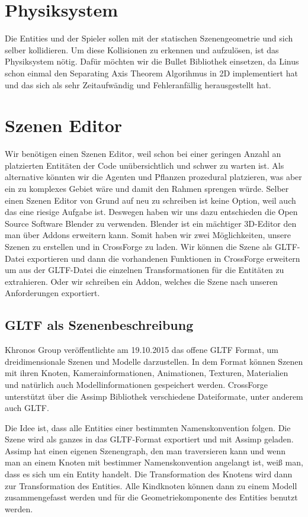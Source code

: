 \section{Physiksystem}

Die Entities und der Spieler sollen mit der statischen Szenengeometrie und sich selber kollidieren. Um diese Kollisionen zu erkennen und aufzulösen, ist das Physiksystem nötig. Dafür möchten wir die Bullet Bibliothek einsetzen, da Linus schon einmal den Separating Axis Theorem Algorihmus in 2D implementiert hat und das sich als sehr Zeitaufwändig und Fehleranfällig herausgestellt hat. 


\section{Szenen Editor}

Wir benötigen einen Szenen Editor, weil schon bei einer geringen Anzahl an platzierten Entitäten der Code unübersichtlich und schwer zu warten ist. Als alternative könnten wir die Agenten und Pflanzen prozedural platzieren, was aber ein zu komplexes Gebiet wäre und damit den Rahmen sprengen würde. Selber einen Szenen Editor von Grund auf neu zu schreiben ist keine Option, weil auch das eine riesige Aufgabe ist. Deswegen haben wir uns dazu entschieden die Open Source Software Blender zu verwenden. Blender ist ein mächtiger 3D-Editor den man über Addons erweitern kann. Somit haben wir zwei Möglichkeiten, unsere Szenen zu erstellen und in CrossForge zu laden. Wir können die Szene als GLTF-Datei exportieren und dann die vorhandenen Funktionen in CrossForge erweitern um aus der GLTF-Datei die einzelnen Transformationen für die Entitäten zu extrahieren. Oder wir schreiben ein Addon, welches die Szene nach unseren Anforderungen exportiert.

\subsection{GLTF als Szenenbeschreibung}

Khronos Group veröffentlichte am 19.10.2015 das offene GLTF Format, um dreidimensionale Szenen und Modelle darzustellen. In dem Format können Szenen mit ihren Knoten, Kamerainformationen, Animationen, Texturen, Materialien und natürlich auch Modellinformationen gespeichert werden. CrossForge unterstützt über die Assimp Bibliothek verschiedene Dateiformate, unter anderem auch GLTF.

Die Idee ist, dass alle Entities einer bestimmten Namenskonvention folgen. Die Szene wird als ganzes in das GLTF-Format exportiert und mit Assimp geladen. Assimp hat einen eigenen Szenengraph, den man traversieren kann und wenn man an einem Knoten mit bestimmer Namenskonvention angelangt ist, weiß man, dass es sich um ein Entity handelt. Die Transformation des Knotens wird dann zur Transformation des Entities. Alle Kindknoten können dann zu einem Modell zusammengefasst werden und für die Geometriekomponente des Entities benutzt werden.

